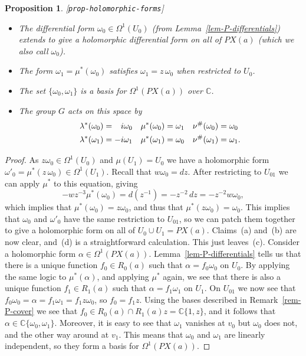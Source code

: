 \documentclass[reqno]{amsart}
\newcommand{\lbl}[1]{\label{#1}\textup{[\texttt{#1}]}\par}
\newcommand{\lbl}{\label}
\newcommand{\Om}        {\Omega}
\newcommand{\al}        {\alpha}
\newcommand{\lm}        {\lambda}
\newcommand{\om}        {\omega}
\newcommand{\C}         {{\mathbb{C}}}
\newcommand{\pp}        {\hphantom{+}}
\renewcommand{\:}{\colon}
\newtheorem{proposition}[theorem]{Proposition}
\theoremstyle{definition}
\begin{document}
\begin{proposition}\lbl{prop-holomorphic-forms}\leavevmode
 \begin{itemize}
  \item[(a)] The differential form $\om_0\in\Om^1(U_0)$ (from
   Lemma~\ref{lem-P-differentials}) extends to give a holomorphic
   differential form on all of $PX(a)$ (which we also call $\om_0$).
  \item[(b)] The form $\om_1=\mu^*(\om_0)$ satisfies $\om_1=z\,\om_0$
   when restricted to $U_0$.
  \item[(c)] The set $\{\om_0,\om_1\}$ is a basis for $\Om^1(PX(a))$
   over $\C$.
  \item[(d)] The group $G$ acts on this space by
   \begin{align*}
    \lm^*(\om_0)  &= \pp i\om_0 &
    \mu^*(\om_0)  &= \om_1 &
    \nu^\#(\om_0) &= \om_0 \\
    \lm^*(\om_1)  &=    -i\om_1 &
    \mu^*(\om_1)  &= \om_0 &
    \nu^\#(\om_1) &= \om_1.
   \end{align*}
 \end{itemize}
\end{proposition}
\begin{proof}
 As $z\om_0\in\Om^1(U_0)$ and $\mu(U_1)=U_0$ we have a holomorphic
 form $\om'_0=\mu^*(z\,\om_0)\in\Om^1(U_1)$.  Recall that
 $w\om_0=dz$.  After restricting to $U_{01}$ we can apply $\mu^*$ to
 this equation, giving
 \[ -wz^{-3}\mu^*(\om_0) = d(z^{-1})
                         = -z^{-2}\,dz
                         = -z^{-2}w\om_0,
 \]
 which implies that $\mu^*(\om_0)=z\om_0$, and thus that
 $\mu^*(z\om_0)=\om_0$.  This implies that $\om_0$ and $\om'_0$ have
 the same restriction to $U_{01}$, so we can patch them together to
 give a holomorphic form on all of $U_0\cup U_1=PX(a)$.  Claims~(a)
 and~(b) are now clear, and~(d) is a straightforward calculation.
 This just leaves~(c).  Consider a holomorphic form
 $\al\in\Om^1(PX(a))$.  Lemma~\ref{lem-P-differentials} tells us
 that there is a unique function $f_0\in R_0(a)$ such that
 $\al=f_0\om_0$ on $U_0$.  By applying the same logic to $\mu^*(\al)$,
 and applying $\mu^*$ again, we see that there is also a unique
 function $f_1\in R_1(a)$ such that $\al=f_1\om_1$ on $U_1$.  On
 $U_{01}$ we now see that $f_0\om_0=\al=f_1\om_1=f_1z\om_0$, so
 $f_0=f_1z$.  Using the bases described in Remark~\ref{rem-P-cover}
 we see that $f_0\in R_0(a)\cap R_1(a)z=\C\{1,z\}$, and it follows
 that $\al\in\C\{\om_0,\om_1\}$.  Moreover, it is easy to see that
 $\om_1$ vanishes at $v_0$ but $\om_0$ does not, and the other way
 around at $v_1$.  This means that $\om_0$ and $\om_1$ are linearly
 independent, so they form a basis for $\Om^1(PX(a))$.
\end{proof}
\end{document}
